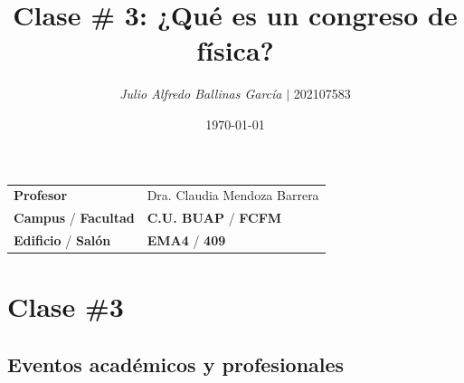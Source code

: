 \documentclass{article}
\title{ \textcolor{Tarawera}{\textbf{Clase \# 3}}: \textcolor{Cinnabar}{\textbf{¿Qué es un congreso de física?}}}
\author{\emph{Julio Alfredo Ballinas García} $\boldsymbol{\mid}$ 202107583}
\date{\today}
\begin{document}
\maketitle



\begin{mybox}
	\noindent\begin{tabular}{@{}ll}
		{\bfseries{Profesor}} & Dra. Claudia Mendoza Barrera\\
		\textcolor{prussianblue}{\bfseries{Campus}} / \textcolor{trueblue}{\bfseries{Facultad}}  & \textcolor{prussianblue}{\bfseries{C.U. BUAP}} /  \textcolor{trueblue}{\bfseries{FCFM}} \\
		\textcolor{prussianblue}{\bfseries{Edificio}} /  \textcolor{trueblue}{\bfseries{Salón}}    & 	\textcolor{prussianblue}{\bfseries{EMA4}} /  \textcolor{trueblue}{\bfseries{409}}   
	\end{tabular} 
\end{mybox} \vspace{1cm}


	



\tableofcontents \vspace{0.5cm}


\section{Clase \#3} \vspace{0.5cm}

\subsection{Eventos académicos y profesionales} \vspace{0.5cm}
\end{document}
